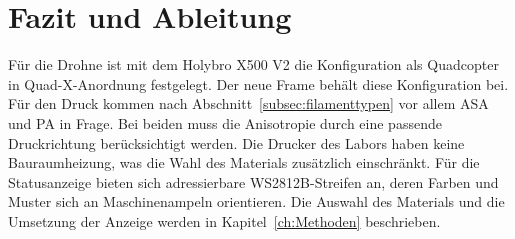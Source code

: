     \section{Fazit und Ableitung}
    \label{sec:SdT_Fazit}

    Für die Drohne ist mit dem Holybro X500 V2 die Konfiguration als Quadcopter in Quad-X-Anordnung festgelegt. Der neue Frame behält diese Konfiguration bei. Für den Druck kommen nach Abschnitt~\ref{subsec:filamenttypen} vor allem ASA und PA in Frage. Bei beiden muss die Anisotropie durch eine passende Druckrichtung berücksichtigt werden. Die Drucker des Labors haben keine Bauraumheizung, was die Wahl des Materials zusätzlich einschränkt. Für die Statusanzeige bieten sich adressierbare WS2812B-Streifen an, deren Farben und Muster sich an Maschinenampeln orientieren. Die Auswahl des Materials und die Umsetzung der Anzeige werden in Kapitel~\ref{ch:Methoden} beschrieben.
